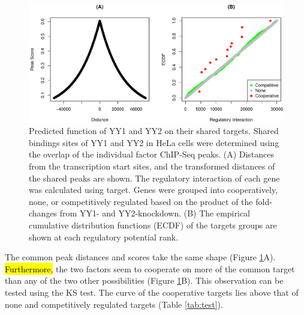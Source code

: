 \documentclass[9pt,a4paper,]{extarticle}
\begin{document}
\begin{figure}

{\centering \includegraphics[width=1\linewidth]{targetFlow_files/figure-latex/function-1} 

}

\caption{Predicted function of YY1 and YY2 on their shared targets. Shared bindings sites of YY1 and YY2 in HeLa cells were determined using the overlap of the individual factor ChIP-Seq peaks. (A) Distances from the transcription start sites, and the transformed distances of the shared peaks are shown. The regulatory interaction of each gene was calculated using target. Genes were grouped into cooperatively, none, or competitively regulated based on the product of the fold-changes from YY1- and YY2-knockdown. (B) The empirical cumulative distribution functions (ECDF) of the targets groups are shown at each regulatory potential rank.}\label{fig:function}
\end{figure}

The common peak distances and scores take the same shape (Figure \ref{fig:function}A). \hl{Furthermore,} the two factors seem to cooperate on more of the common target than any of the two other possibilities (Figure \ref{fig:function}B). This observation can be tested using the KS test. The curve of the cooperative targets lies above that of none and competitively regulated targets (Table \ref{tab:test}).
\end{document}
